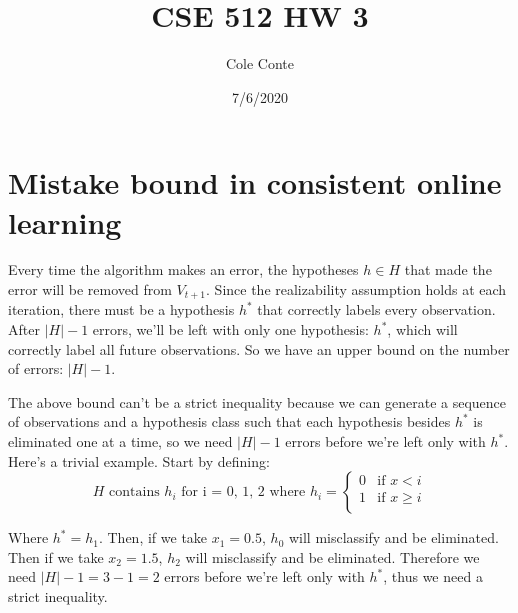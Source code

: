 \documentclass{article}
\begin{document}
\title{CSE 512 HW 3}
\author{Cole Conte}
\date{7/6/2020}

\maketitle

\section{Mistake bound in consistent online learning}
Every time the algorithm makes an error, the hypotheses \(h \in H\) that made the error will be removed from \(V_{t+1}\). Since the realizability assumption holds at each iteration, there must be a hypothesis \(h^*\) that correctly labels every observation. After \(|H| - 1 \) errors, we'll be left with only one hypothesis: \(h^*\), which will correctly label all future observations. So we have an upper bound on the number of errors: \(|H| - 1 \).

The above bound can't be a strict inequality because we can generate a sequence of observations and a hypothesis class such that each hypothesis besides \(h^*\) is eliminated one at a time, so we need \(|H| - 1 \) errors before we're left only with  \(h^* \). Here's a trivial example. Start by defining:
\begin{equation}
H  \text{ contains } h_i \text{ for i = 0, 1, 2 where }
h_i =
 \begin{cases}
                                   0 & \text{if $x<i$} \\
                                   1 & \text{if $x \geq i$} \\
                                   
\end{cases}
\end{equation}

Where \(h^*=h_1\). Then, if we take \(x_1 = 0.5\), \(h_0\) will misclassify and be eliminated. Then if we take \(x_2 = 1.5\), \(h_2\) will misclassify and be eliminated. Therefore we need \(|H| - 1 = 3-1 = 2\)  errors before we're left only with  \(h^* \), thus we need a strict inequality.
\end{document}
